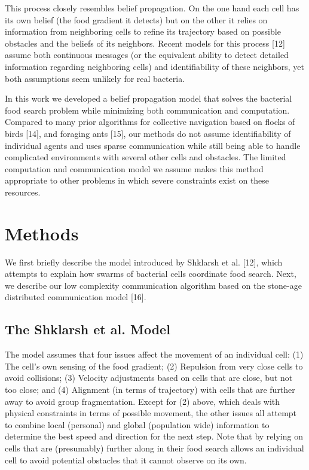 \documentclass{article}
\begin{document}
This process closely resembles belief propagation. On the one hand each cell
has its own belief (the food gradient it detects) but on the other it relies on
information from neighboring cells to refine its trajectory based on possible
obstacles and the beliefs of its neighbors. Recent models for this process [12]
assume both continuous messages (or the equivalent ability to detect detailed
information regarding neighboring cells) and identifiability of these
neighbors, yet both assumptions seem unlikely for real bacteria.

In this work we developed a belief propagation model that solves the bacterial
food search problem while minimizing both communication and computation.
Compared to many prior algorithms for collective navigation based on flocks of
birds [14], and foraging ants [15], our methods do not assume identifiability
of individual agents and uses sparse communication while still being able to
handle complicated environments with several other cells and obstacles. The
limited computation and communication model we assume makes this method
appropriate to other problems in which severe constraints exist on these
resources. 

\section*{Methods}
We first briefly describe the model introduced by Shklarsh et al. [12], which
attempts to explain how swarms of bacterial cells coordinate food search. Next,
we describe our low complexity communication algorithm based on the stone-age
distributed communication model [16].

\subsection*{The Shklarsh et al. Model}
The model assumes that four issues affect the movement of an individual cell:
(1) The cell’s own sensing of the food gradient; (2) Repulsion from very close
cells to avoid collisions; (3) Velocity adjustments based on cells that are
close, but not too close; and (4) Alignment (in terms of trajectory) with cells
that are further away to avoid group fragmentation. Except for (2) above, which
deals with physical constraints in terms of possible movement, the other issues
all attempt to combine local (personal) and global (population wide)
information to determine the best speed and direction for the next step. Note
that by relying on cells that are (presumably) further along in their food
search allows an individual cell to avoid potential obstacles that it cannot
observe on its own.
\end{document}
